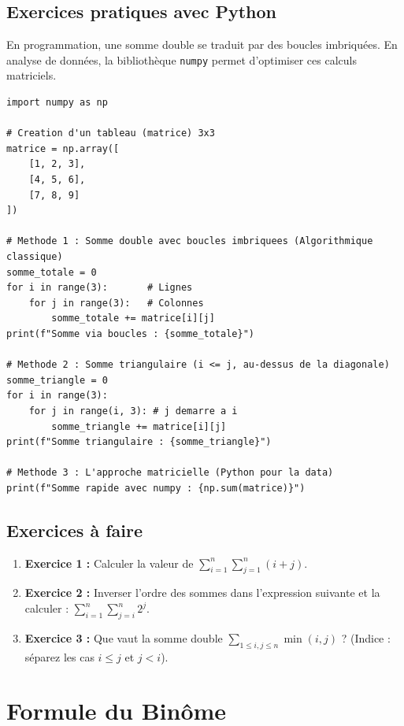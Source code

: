 \subsection{Exercices pratiques avec Python}
En programmation, une somme double se traduit par des boucles imbriquées. En analyse de données, la bibliothèque \texttt{numpy} permet d'optimiser ces calculs matriciels.

\begin{lstlisting}
import numpy as np

# Creation d'un tableau (matrice) 3x3
matrice = np.array([
    [1, 2, 3],
    [4, 5, 6],
    [7, 8, 9]
])

# Methode 1 : Somme double avec boucles imbriquees (Algorithmique classique)
somme_totale = 0
for i in range(3):       # Lignes
    for j in range(3):   # Colonnes
        somme_totale += matrice[i][j]
print(f"Somme via boucles : {somme_totale}")

# Methode 2 : Somme triangulaire (i <= j, au-dessus de la diagonale)
somme_triangle = 0
for i in range(3):
    for j in range(i, 3): # j demarre a i
        somme_triangle += matrice[i][j]
print(f"Somme triangulaire : {somme_triangle}")

# Methode 3 : L'approche matricielle (Python pour la data)
print(f"Somme rapide avec numpy : {np.sum(matrice)}")
\end{lstlisting}

\subsection{Exercices à faire}
\begin{enumerate}
    \item \textbf{Exercice 1 :} Calculer la valeur de $\sum_{i=1}^{n} \sum_{j=1}^{n} (i+j)$.
    \item \textbf{Exercice 2 :} Inverser l'ordre des sommes dans l'expression suivante et la calculer : $\sum_{i=1}^{n} \sum_{j=i}^{n} 2^j$.
    \item \textbf{Exercice 3 :} Que vaut la somme double $\sum_{1 \le i,j \le n} \min(i,j)$ ? (Indice : séparez les cas $i \le j$ et $j < i$).
\end{enumerate}

\section{Formule du Binôme}


